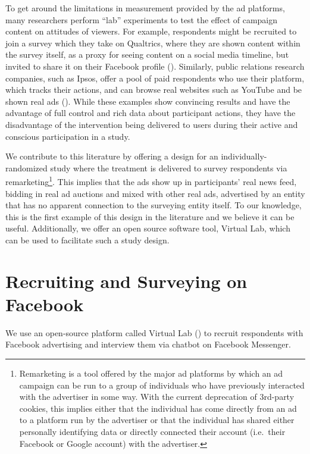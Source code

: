 \documentclass[a4paper,12pt]{article}
\theoremstyle{proposition}
\begin{document}
To get around the limitations in measurement provided by the ad platforms, many researchers perform ``lab'' experiments to test the effect of campaign content on attitudes of viewers. For example, respondents might be recruited to join a survey which they take on Qualtrics, where they are shown content within the survey itself, as a proxy for seeing content on a social media timeline, but invited to share it on their Facebook profile (\cite{Henry2020}). Similarly, public relations research companies, such as Ipsos, offer a pool of paid respondents who use their platform, which tracks their actions, and can browse real websites such as YouTube and be shown real ads (\cite{Evans2021}). While these examples show convincing results and have the advantage of full control and rich data about participant actions, they have the disadvantage of the intervention being delivered to users during their active and conscious participation in a study.

We contribute to this literature by offering a design for an individually-randomized study where the treatment is delivered to survey respondents via remarketing\footnote{Remarketing is a tool offered by the major ad platforms by which an ad campaign can be run to a group of individuals who have previously interacted with the advertiser in some way. With the current deprecation of 3rd-party cookies, this implies either that the individual has come directly from an ad to a platform run by the advertiser or that the individual has shared either personally identifying data or directly connected their account (i.e.\ their Facebook or Google account) with the advertiser.}. This implies that the ads show up in participants' real news feed, bidding in real ad auctions and mixed with other real ads, advertised by an entity that has no apparent connection to the surveying entity itself. To our knowledge, this is the first example of this design in the literature and we believe it can be useful. Additionally, we offer an open source software tool, Virtual Lab, which can be used to facilitate such a study design.



\section{Recruiting and Surveying on Facebook}

We use an open-source platform called Virtual Lab (\cite{Rao2020}) to recruit respondents with Facebook advertising and interview them via chatbot on Facebook Messenger.
\end{document}
